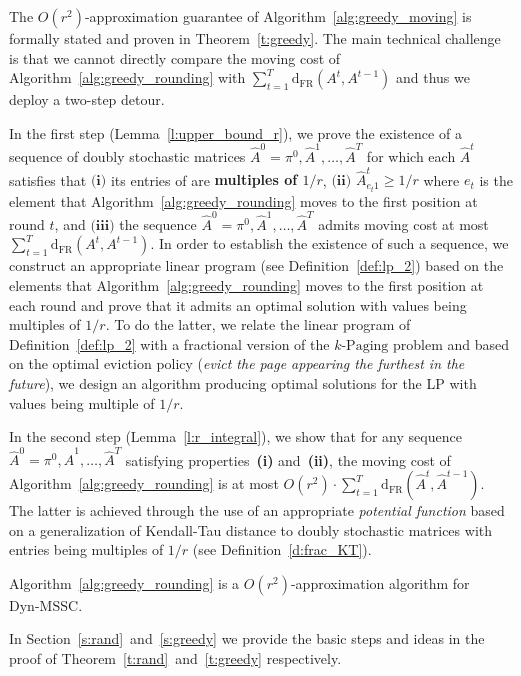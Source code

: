\documentclass[a4paper,UKenglish,cleveref,autoref, thm-restate]{lipics-v2019}
\def\DSSC{\mathrm{Dyn}\text{-}\mathrm{MSSC}}
\def\dfr{\mathrm{d}_{\mathrm{FR}}}
\begin{document}
\noindent The $O(r^2)$-approximation guarantee of Algorithm~\ref{alg:greedy_moving} is formally stated and proven in Theorem~\ref{t:greedy}. The main technical challenge is that we cannot directly compare the moving cost of Algorithm~\ref{alg:greedy_rounding} with $\sum_{t=1}^T \dfr(A^t,A^{t-1})$ and thus we deploy a two-step detour.

In the first step (Lemma~\ref{l:upper_bound_r}), we prove the existence of a 
sequence of doubly stochastic matrices $\hat{A}^0 =\pi^0,\hat{A}^1,\ldots,\hat{A}^T$ for which each $\hat{A}^t$ satisfies that $\textbf{(i)}$ its entries of  are \textbf{multiples of $1/r$}, $\textbf{(ii)}$ $\hat{A}^t_{e_t 1} \geq 1/r$ where $e_t$ is the element that Algorithm~\ref{alg:greedy_rounding} moves to the first position at round $t$, and $\textbf{(iii)}$ the sequence
$\hat{A}^0 =\pi^0,\hat{A}^1,\ldots,\hat{A}^T$ admits moving cost at most 
$\sum_{t=1}^T \mathrm{d}_{\mathrm{FR}}(A^t,A^{t-1})$. In order to establish the existence of such a sequence, we construct an appropriate linear program (see Definition~\ref{def:lp_2}) based on the elements 
that Algorithm~\ref{alg:greedy_rounding} moves to the first position at each round and prove that it admits an optimal solution with values being multiples of $1/r$. To do the latter, we
relate the linear program of Definition~\ref{def:lp_2} with a fractional version of the $k$-$\mathrm{Paging}$ \cite{BBN12} problem and based on the optimal eviction policy
(\textit{evict the page appearing the furthest in the future}), we design an algorithm producing optimal solutions for the LP with values being multiple of $1/r$.

In the second step (Lemma~\ref{l:r_integral}), we show that for any sequence $\hat{A}^0 =\pi^0,\hat{A}^1,\ldots,\hat{A}^T$ satisfying properties~\textbf{(i)} and~\textbf{(ii)}, the moving cost of Algorithm~\ref{alg:greedy_rounding} is at most $O(r^2) \cdot \sum_{t=1}^T \dfr(\hat{A}^t,\hat{A}^{t-1})$. The latter is achieved through the use of an appropriate \textit{potential function} based on a generalization of Kendall-Tau distance to  
doubly stochastic matrices with entries being multiples
of $1/r$ (see Definition~\ref{d:frac_KT}).
\begin{theorem}\label{t:greedy}
Algorithm~\ref{alg:greedy_rounding}
is a $O(r^2)$-approximation algorithm for $\DSSC$.
\end{theorem}
\noindent In Section~\ref{s:rand}~and~\ref{s:greedy} we provide the basic steps and ideas in the proof of Theorem~\ref{t:rand}~and~\ref{t:greedy} respectively.
\end{document}

